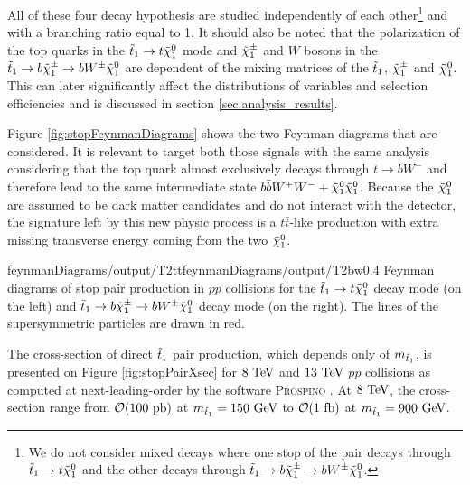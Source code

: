         All of these four decay hypothesis are studied independently
        of each other\footnote{We do not consider mixed decays where one stop of the pair 
        decays through $\tilde{t}_1 \rightarrow t \tilde{\chi}_1^0$ and the other decays through 
        $\tilde{t}_1 \rightarrow b \tilde{\chi}_1^\pm \rightarrow b W^{\pm} \tilde{\chi}_1^0$.} and with a 
        branching ratio equal to 1. It should also be noted that the polarization of the 
        top quarks in the $\tilde{t}_1 \rightarrow t \tilde{\chi}_1^0$ mode and $\tilde{\chi}_1^\pm$ and 
        $W$ bosons in the $\tilde{t}_1 \rightarrow b \tilde{\chi}_1^\pm \rightarrow b W^{\pm} 
        \tilde{\chi}_1^0$ are dependent of the mixing matrices of the $\tilde{t}_1$, $\tilde{\chi}_1^\pm$ 
        and $\tilde{\chi}_1^0$. This can later significantly affect the distributions of 
        variables and selection efficiencies and is discussed in section 
        \ref{sec:analysis_results}.

        Figure \ref{fig:stopFeynmanDiagrams} shows the two Feynman diagrams that are 
        considered. It is relevant to target both those signals with the same analysis 
        considering that the top quark almost exclusively decays through $t \rightarrow 
        b W^+$ and therefore lead to the same intermediate state $b \bar{b} W^+ W^- + 
        \tilde{\chi}_1^0 \tilde{\chi}_1^0$. Because the $\tilde{\chi}_1^0$ are assumed to be dark 
        matter candidates and do not interact with the detector, the signature left by 
        this new physic process is a $t\bar{t}$-like production with extra missing 
        transverse energy coming from the two $\tilde{\chi}_1^0$.

                         {feynmanDiagrams/output/T2tt}{feynmanDiagrams/output/T2bw}{0.4}
                         {Feynman diagrams of stop pair production in $pp$ collisions for the 
                         $\tilde{t}_1 \rightarrow t \tilde{\chi}_1^0$ decay mode (on the left) and 
                         $\tilde{t}_1 \rightarrow b \tilde{\chi}_1^\pm \rightarrow b W^{\pm} \tilde{\chi}_1^0$ decay mode 
                         (on the right). The lines of the supersymmetric particles are drawn in red.}

        The cross-section of direct $\tilde{t}_1$ pair production, which depends only of $m_{\tilde{t}_1}$, is presented 
        on Figure \ref{fig:stopPairXsec} for $8~\text{TeV}$ and $13~\text{TeV}$ $pp$ collisions as computed at next-leading-order 
        by the software \textsc{Prospino} . At $8~\text{TeV}$, the cross-section range from $\mathcal{O}(100~\text{pb})$
        at $m_{\tilde{t}_1} = 150~\text{GeV}$ to $\mathcal{O}(1~\text{fb})$ at $m_{\tilde{t}_1} = 900 ~\text{GeV}$.

